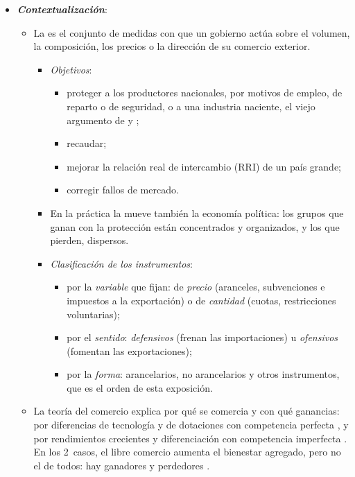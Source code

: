 \documentclass[11pt]{article}
\begin{document}
\begin{itemize}
\item \textbf{\emph{Contextualización}}:
  \begin{itemize}
  \item La  es el conjunto de medidas con que un gobierno actúa sobre el volumen, la composición, los precios o la dirección de su comercio exterior.
    \begin{itemize}
    \item \emph{Objetivos}:
      \begin{itemize}
      \item proteger a los productores nacionales, por motivos de empleo, de reparto o de seguridad, o a una industria naciente, el viejo argumento de \textcite{Hamilton1791Report} y \textcite{List1841System} ;
      \item recaudar;
      \item mejorar la relación real de intercambio (RRI) de un país grande;
      \item corregir fallos de mercado.
      \end{itemize}
    \item En la práctica la mueve también la economía política: los grupos que ganan con la protección están concentrados y organizados, y los que pierden, dispersos\nocite{GrossmanHelpman1994Protection}.
    \item \emph{Clasificación de los instrumentos}:
      \begin{itemize}
      \item por la \emph{variable} que fijan: de \emph{precio} (aranceles, subvenciones e impuestos a la exportación) o de \emph{cantidad} (cuotas, restricciones voluntarias);
      \item por el \emph{sentido}: \emph{defensivos} (frenan las importaciones) u \emph{ofensivos} (fomentan las exportaciones);
      \item por la \emph{forma}: arancelarios, no arancelarios y otros instrumentos, que es el orden de esta exposición.
      \end{itemize}
    \end{itemize}
  \item La teoría del comercio explica por qué se comercia y con qué ganancias: por diferencias de tecnología y de dotaciones con competencia perfecta , y por rendimientos crecientes y diferenciación con competencia imperfecta . En los 2~casos, el libre comercio aumenta el bienestar agregado, pero no el de todos: hay ganadores y perdedores\nocite{StolperSamuelson1941Protection} .

\end{itemize}
\end{itemize}
\end{document}
